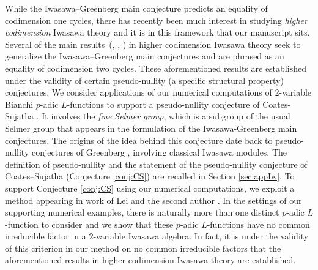 \documentclass[a4paper,11pt]{article}
\numberwithin{equation}{section}
\begin{document}
While the Iwasawa--Greenberg main conjecture predicts an equality of codimension one cycles, there has recently been much interest in studying \textit{higher codimension} Iwasawa theory and it is in this framework that our manuscript sits. Several of the main  results~(\cite[Theorem 5.2.5]{bleher2015higher}, \cite[Theorem 1]{lei2018codimension}, \cite[Theorem 1]{lei2019codimension}) in higher codimension Iwasawa theory seek to generalize the Iwasawa--Greenberg main conjectures and are phrased as an equality of codimension two cycles. These aforementioned results are established under the validity of certain pseudo-nullity (a specific structural property) conjectures. We consider applications of our numerical computations of $2$-variable Bianchi $p$-adic $L$-functions to support a pseudo-nullity conjecture of Coates-Sujatha \cite[Conjecture B]{MR2148798}.  It involves the \textit{fine Selmer group}, which is a subgroup of the usual Selmer group that appears in the formulation of the Iwasawa-Greenberg main conjectures. The origins of the idea behind this conjecture date back to pseudo-nullity conjectures of Greenberg \cite{Gre76}, \cite[Conjecture 3.5]{MR1846466} involving classical Iwasawa modules. The definition of pseudo-nullity and the statement of the pseudo-nullity conjecture of Coates--Sujatha (Conjecture \ref{conj:CS}) are recalled in Section \ref{sec:appIw}. To support Conjecture \ref{conj:CS} using our numerical computations, we exploit a method appearing in work of Lei and the second author \cite{lei2018codimension}. In the settings of our supporting numerical examples, there is naturally more than one distinct $p$-adic $L$-function to consider and we show that these $p$-adic $L$-functions have no common irreducible factor in a $2$-variable Iwasawa algebra. In fact, it is under the validity of this criterion in our method  on no common irreducible factors that the aforementioned results in higher codimension Iwasawa theory are established. \\
\end{document}
